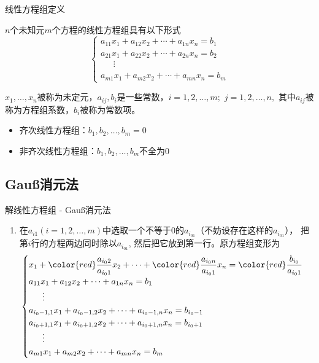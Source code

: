 \begin{frame}{线性方程组定义}

$n$个未知元$m$个方程的线性方程组具有以下形式
\[
\begin{cases}
a_{11}x_1 + a_{12}x_2 + \cdots + a_{1n}x_n = b_1 \\
a_{21}x_1 + a_{22}x_2 + \cdots + a_{2n}x_n = b_2 \\
\phantom{yyy} \vdots \\
a_{m1}x_1 + a_{m2}x_2 + \cdots + a_{mn}x_n = b_m
\end{cases}\]

\pause

$x_1,\ldots,x_n$被称为未定元，$a_{ij},b_i$是一些常数，$i=1,2,\ldots,m;$ $j = 1,2,\ldots,n,$ 其中$a_{ij}$被称为方程组系数，$b_i$被称为常数项。

\pause

\begin{itemize}
\item 齐次线性方程组：$b_1,b_2,\ldots,b_m = 0$
\item 非齐次线性方程组：$b_1,b_2,\ldots,b_m$不全为$0$
\end{itemize}

\end{frame}


\subsection{Gau{\ss}消元法}


\begin{frame}{解线性方程组 - Gau{\ss}消元法}

\begin{enumerate}
\item 在$a_{i1} (i=1,2,\ldots,m)$中选取一个不等于$0$的$a_{i_01}$（不妨设存在这样的$a_{i_01}$）， 把第$i$行的方程两边同时除以$a_{i_01}$, 然后把它放到第一行。原方程组变形为
\[
\begin{cases}
x_1 + {\color{red} \dfrac{a_{i_02}}{a_{i_01}}}x_2 + \cdots + {\color{red} \dfrac{a_{i_0n}}{a_{i_01}}}x_n = {\color{red} \dfrac{b_{i_0}}{a_{i_01}}} \\
a_{11}x_1 + a_{12}x_2 + \cdots + a_{1n}x_n = b_1 \\
\phantom{yyy} \vdots \\
a_{i_0-1,1}x_1 + a_{i_0-1,2}x_2 + \cdots + a_{i_0-1,n}x_n = b_{i_0-1} \\
a_{i_0+1,1}x_1 + a_{i_0+1,2}x_2 + \cdots + a_{i_0+1,n}x_n = b_{i_0+1} \\
\phantom{yyy} \vdots \\
a_{m1}x_1 + a_{m2}x_2 + \cdots + a_{mn}x_n = b_m
\end{cases}\]
\end{enumerate}

\end{frame}


